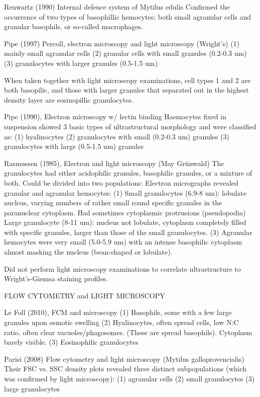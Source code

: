 Renwartz (1990) Internal defence system of Mytilus edulis \cite{Renwartz1990}
Confirmed the occurrence of two types of basophillic hemocytes: both small agranular cells and granular basophils, or so-called macrophages.

Pipe (1997) Percoll, electron microscopy and light microscopy (Wright's)
(1) mainly small agranular cells 
(2) granular cells with small granules (0.2-0.3 um)
(3) granulocytes with larger granules (0.5-1.5 um)

When taken together with light microscopy examinations, cell types 1 and 2 are both basopilic, and those with larger granules that separated out in the highest density layer are eosinopillic granulocytes.

Pipe (1990), Electron microscopy w/ lectin binding
Haemocytes fixed in suspension showed 3 basic types of ultrastructural morphology and were classified as:
(1) hyalinocytes
(2) granulocytes with small (0.2-0.3 um) granules
(3) granulocytes with large (0.5-1.5 um) granules

Rasmussen (1985), Electron and light microscopy (May Grünwald) \cite{Rasmussen1985}
The granulocytes had either acidophilic granules, basophilic granules, or a mixture of both. Could be divided into two populations:
Electron micrographs revealed granular and agranular hemocytes:
(1) Small granulocytes (6.9-8 um): lobulate nucleus, varying numbers of rather small round specific granules in the paranuclear cytoplasm. Had sometimes cytoplasmic protrusions (pseudopodia)
Large granulocyte (8-11 um): nucleus not lobulate, cytoplasm completely filled with specific granules, larger than those of the small granulocytes.
(3) Agranular hemocytes were very small (5.0-5.9 um) with an intense basophilic cytoplasm almost masking the nucleus (bean-shaped or lobulate).

Did not perform light microscopy examinations to correlate ultrastructure to Wright's-Giemsa staining profiles.



FLOW CYTOMETRY and LIGHT MICROSCOPY

Le Foll (2010), FCM and microscopy \cite{LeFoll2010}
(1) Basophils, some with a few large granules upon osmotic swelling
(2) Hyalinocytes, often spread cells, low N:C ratio, often clear vacuoles/phagosomes. (These are spread basophils). Cytoplasm barely visible.
(3) Eosinophilic granulocytes

Parisi (2008) Flow cytometry and light microscopy (Mytilus galloprovencialis)
Their FSC vs. SSC density plots revealed three distinct subpopulations (which was confirmed by light microscopy):
(1) agranular cells
(2) small granulocytes
(3) large granulocytes



